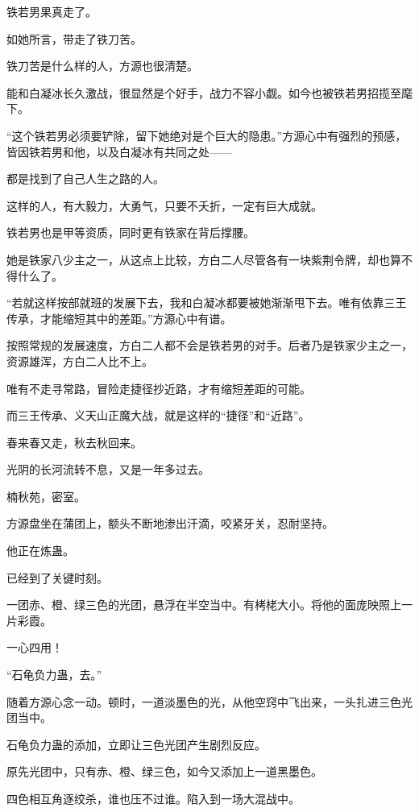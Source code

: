 
\begin{this_body}

铁若男果真走了。

如她所言，带走了铁刀苦。

铁刀苦是什么样的人，方源也很清楚。

能和白凝冰长久激战，很显然是个好手，战力不容小觑。如今也被铁若男招揽至麾下。

“这个铁若男必须要铲除，留下她绝对是个巨大的隐患。”方源心中有强烈的预感，皆因铁若男和他，以及白凝冰有共同之处——

都是找到了自己人生之路的人。

这样的人，有大毅力，大勇气，只要不夭折，一定有巨大成就。

铁若男也是甲等资质，同时更有铁家在背后撑腰。

她是铁家八少主之一，从这点上比较，方白二人尽管各有一块紫荆令牌，却也算不得什么了。

“若就这样按部就班的发展下去，我和白凝冰都要被她渐渐甩下去。唯有依靠三王传承，才能缩短其中的差距。”方源心中有谱。

按照常规的发展速度，方白二人都不会是铁若男的对手。后者乃是铁家少主之一，资源雄浑，方白二人比不上。

唯有不走寻常路，冒险走捷径抄近路，才有缩短差距的可能。

而三王传承、义天山正魔大战，就是这样的“捷径”和“近路”。

春来春又走，秋去秋回来。

光阴的长河流转不息，又是一年多过去。

楠秋苑，密室。

方源盘坐在蒲团上，额头不断地渗出汗滴，咬紧牙关，忍耐坚持。

他正在炼蛊。

已经到了关键时刻。

一团赤、橙、绿三色的光团，悬浮在半空当中。有栲栳大小。将他的面庞映照上一片彩霞。

一心四用！

“石龟负力蛊，去。”

随着方源心念一动。顿时，一道淡墨色的光，从他空窍中飞出来，一头扎进三色光团当中。

石龟负力蛊的添加，立即让三色光团产生剧烈反应。

原先光团中，只有赤、橙、绿三色，如今又添加上一道黑墨色。

四色相互角逐绞杀，谁也压不过谁。陷入到一场大混战中。


\end{this_body}
